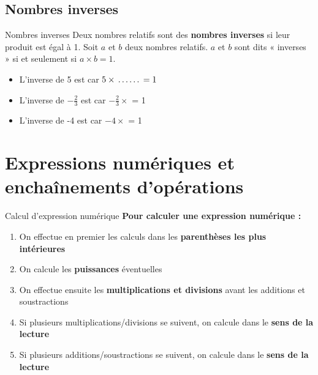 \subsection{Nombres inverses}

\begin{definitionbox}{Nombres inverses}
Deux nombres relatifs sont des \textbf{nombres inverses} si leur produit est égal à 1. Soit $a$ et $b$ deux nombres relatifs. $a$ et $b$ sont dits « inverses » si et seulement si $a \times b = 1$.
\end{definitionbox}

\begin{examplebox}
\begin{itemize}[label = \textbullet]
\item L'inverse de 5 est \trous{1cm} car $5 \times \trous{1cm} = 1$
\item L'inverse de $-\frac{2}{3}$ est \trous{1cm} car $-\frac{2}{3} \times$ \trous{1cm} = 1
\item L'inverse de -4 est \trous{1cm} car $-4 \times$ \trous{1cm} = 1
\end{itemize}
\end{examplebox}

\section{Expressions numériques et enchaînements d'opérations}
\begin{methodebox}{Calcul d'expression numérique}
\textbf{Pour calculer une expression numérique :}
\begin{enumerate}[label = \arabic*)]
\item On effectue en premier les calculs dans les \textbf{parenthèses les plus intérieures}
\item On calcule les \textbf{puissances} éventuelles
\item On effectue ensuite les \textbf{multiplications et divisions} avant les additions et soustractions
\item Si plusieurs multiplications/divisions se suivent, on calcule dans le \textbf{sens de la lecture}
\item Si plusieurs additions/soustractions se suivent, on calcule dans le \textbf{sens de la lecture}
\end{enumerate}
\end{methodebox}

